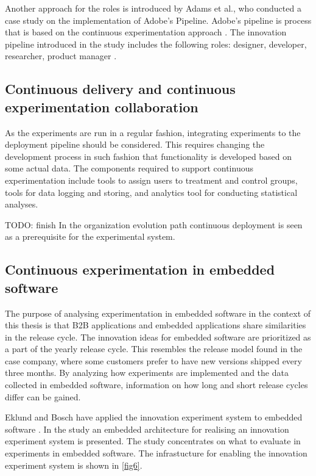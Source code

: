 \documentclass[english]{tktltiki2}
\theoremstyle{definition}
\theoremstyle{remark}
\begin{document}
Another approach for the roles is introduced by Adams et al., who conducted a case study on the implementation of Adobe's Pipeline. Adobe's pipeline is process that is based on the continuous experimentation approach \cite{adams2013creating, adobe}. The innovation pipeline introduced in the study includes the following roles: designer, developer, researcher, product manager \cite{adobe}.

\subsection{Continuous delivery and continuous experimentation collaboration}
As the experiments are run in a regular fashion, integrating experiments to the deployment pipeline should be considered. This requires changing the development process in such fashion that functionality is developed based on some actual data. The components required to support continuous experimentation include tools to assign users to treatment and control groups, tools for data logging and storing, and analytics tool for conducting statistical analyses.

TODO: finish
In the organization evolution path \cite{olsson2012climbing} continuous deployment is seen as a prerequisite for the experimental system. 
\subsection{Continuous experimentation in embedded software}
The purpose of analysing experimentation in embedded software in the context of this thesis is that B2B applications and embedded applications share similarities in the release cycle. The innovation ideas for embedded software are prioritized as a part of the yearly release cycle. This resembles the release model found in the case company, where some customers prefer to have new versions shipped every three months. By analyzing how experiments are implemented and the data collected in embedded software, information on how long and short release cycles differ can be gained. 

Eklund and Bosch have applied the innovation experiment system to embedded software \cite{eklund2012architecture}. In the study an embedded architecture for realising an innovation experiment system is presented. The study concentrates on what to evaluate in experiments in embedded software. The infrastucture for enabling the innovation experiment system is shown in \ref{fig6}.
\end{document}
